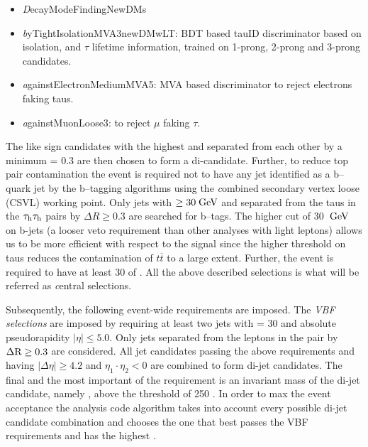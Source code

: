 \begin{itemize}
	
\item {\textit DecayModeFindingNewDMs} 
\item {\textit byTightIsolationMVA3newDMwLT}: BDT based tauID discriminator based on isolation, \pt and $\tau$ lifetime information, trained on 1-prong, 2-prong and 3-prong \hadtau candidates. 
\item {\textit againstElectronMediumMVA5}: MVA based discriminator to reject electrons faking taus. 
\item {\textit againstMuonLoose3}: to reject $\mu$ faking $\tau$. 

\end{itemize}

The like sign \hadtau candidates with the highest \pt and separated from each other by a minimum \deltar = 0.3 are then chosen to form a di-\hadtau candidate. 
Further, to reduce top pair contamination the event is required not to have any jet identified as a b--quark jet by the b--tagging algorithms using the {\textit combined secondary vertex loose} (CSVL) working point. Only jets with \pt $\ge 30 \;\text{Ge}\kern-0.06667em\text{V}$ and separated from the taus in the $\tau_{\text{h}}\tau_{\text{h}}$ pairs by $\Delta R \ge 0.3$ are searched for b--tags. The higher \pt cut of 30 $\;\text{Ge}\kern-0.06667em\text{V}$ on b-jets (a looser veto requirement than other analyses with light leptons) allows us to be more efficient with respect to the signal since the higher \pt threshold on taus reduces the contamination of $t\overline{t}$ to a large extent. Further, the event is required to have at least 30 \gev of \met. All the above described selections is what will be referred as {\textit central selections}.

Subsequently, the following event-wide requirements are imposed. The {\textit {VBF selections}} are imposed by requiring at least two jets with \pt = 30 \gev and absolute pseudorapidity $|\eta| \le 5.0$. Only jets separated from the leptons in the \hadtau\hadtau pair by $\Delta \text{R} \ge 0.3$ are considered. All jet candidates passing the above requirements and having $\vert \Delta\eta \vert \ge 4.2$ and $\eta_{1}\cdot\eta_{2} < 0$ are combined to form di-jet candidates. The final and the most important of the requirement is an invariant mass of the di-jet candidate, namely \mjj, above the threshold of 250 \gev. In order to max the event acceptance the analysis code algorithm takes into account every possible di-jet candidate combination and chooses the one that best passes the VBF requirements and has the highest \mjj. 

